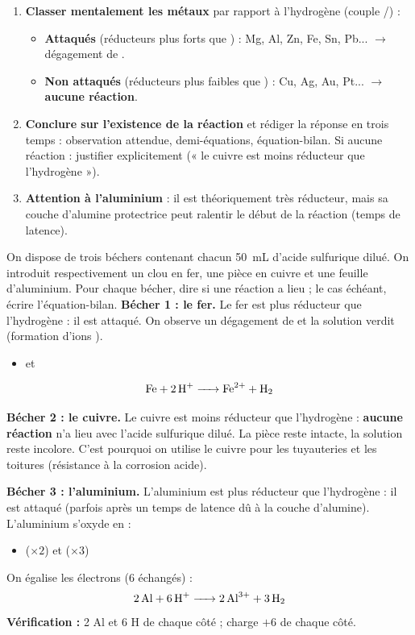 \documentclass[11pt]{article}
\begin{document}
\begin{methode}
\begin{enumerate}
\item \textbf{Classer mentalement les métaux} par rapport à l'hydrogène (couple /) :
      \begin{itemize}
      \item \textbf{Attaqués} (réducteurs plus forts que ) : Mg, Al, Zn, Fe, Sn, Pb... $\rightarrow$ dégagement de .
      \item \textbf{Non attaqués} (réducteurs plus faibles que ) : Cu, Ag, Au, Pt... $\rightarrow$ \textbf{aucune réaction}.
      \end{itemize}
\item \textbf{Conclure sur l'existence de la réaction} et rédiger la réponse en trois temps : observation attendue, demi-équations, équation-bilan. Si aucune réaction : justifier explicitement (« le cuivre est moins réducteur que l'hydrogène »).
\item \textbf{Attention à l'aluminium} : il est théoriquement très réducteur, mais sa couche d'alumine  protectrice peut ralentir le début de la réaction (temps de latence).
\end{enumerate}
\end{methode}

\begin{exoresolu}
On dispose de trois béchers contenant chacun \SI{50}{mL} d'acide sulfurique dilué. On introduit respectivement un clou en fer, une pièce en cuivre et une feuille d'aluminium. Pour chaque bécher, dire si une réaction a lieu ; le cas échéant, écrire l'équation-bilan.
\tcblower
\textbf{Bécher 1 : le fer.} Le fer est plus réducteur que l'hydrogène : il est attaqué. On observe un dégagement de  et la solution verdit (formation d'ions ).
\begin{itemize}
\item {} et 
\end{itemize}
\[ \ce{Fe + 2H+ -> Fe^2+ + H2} \]

\textbf{Bécher 2 : le cuivre.} Le cuivre est moins réducteur que l'hydrogène : \textbf{aucune réaction} n'a lieu avec l'acide sulfurique dilué. La pièce reste intacte, la solution reste incolore. C'est pourquoi on utilise le cuivre pour les tuyauteries et les toitures (résistance à la corrosion acide).

\textbf{Bécher 3 : l'aluminium.} L'aluminium est plus réducteur que l'hydrogène : il est attaqué (parfois après un temps de latence dû à la couche d'alumine). L'aluminium s'oxyde en  :
\begin{itemize}
\item {} ($\times 2$) et  ($\times 3$)
\end{itemize}
On égalise les électrons (6 échangés) :
\[ \ce{2Al + 6H+ -> 2Al^3+ + 3H2} \]
\textbf{Vérification :} 2 Al et 6 H de chaque côté ; charge $+6$ de chaque côté.
\end{exoresolu}
\end{document}
